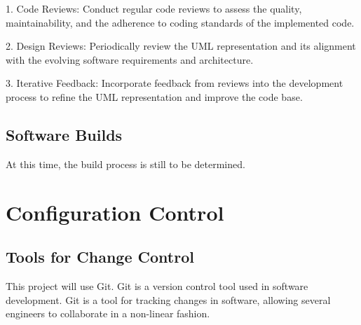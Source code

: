 \documentclass[letterpaper,12pt,oneside,listof=totoc]{scrreprt}
\begin{document}
1. Code Reviews: Conduct regular code reviews to assess the quality, maintainability, and the adherence to coding standards of the implemented code.

2. Design Reviews: Periodically review the UML representation and its alignment with the evolving software requirements and architecture.

3. Iterative Feedback: Incorporate feedback from reviews into the development process to refine the UML representation and improve the code base.

\subsection{Software Builds}

At this time, the build process is still to be determined.




\section{Configuration Control}

\subsection{Tools for Change Control}

This project will use Git. Git is a version control tool used in software development. Git is a tool for tracking changes in software, allowing several engineers to collaborate in a non-linear fashion.
\end{document}
